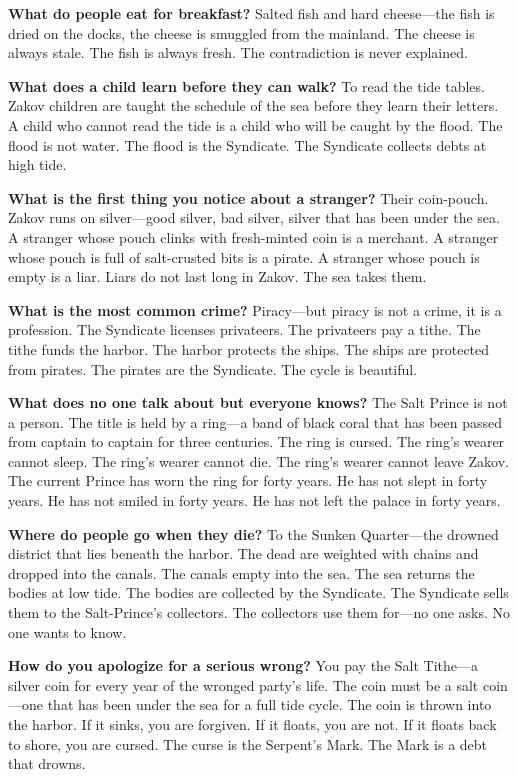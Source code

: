\vspace{1em}

\begin{almanac}
\textbf{What do people eat for breakfast?} Salted fish and hard cheese---the fish is dried on the docks, the cheese is smuggled from the mainland. The cheese is always stale. The fish is always fresh. The contradiction is never explained.

\textbf{What does a child learn before they can walk?} To read the tide tables. Zakov children are taught the schedule of the sea before they learn their letters. A child who cannot read the tide is a child who will be caught by the flood. The flood is not water. The flood is the Syndicate. The Syndicate collects debts at high tide.

\textbf{What is the first thing you notice about a stranger?} Their coin-pouch. Zakov runs on silver---good silver, bad silver, silver that has been under the sea. A stranger whose pouch clinks with fresh-minted coin is a merchant. A stranger whose pouch is full of salt-crusted bits is a pirate. A stranger whose pouch is empty is a liar. Liars do not last long in Zakov. The sea takes them.

\textbf{What is the most common crime?} Piracy---but piracy is not a crime, it is a profession. The Syndicate licenses privateers. The privateers pay a tithe. The tithe funds the harbor. The harbor protects the ships. The ships are protected from pirates. The pirates are the Syndicate. The cycle is beautiful.

\textbf{What does no one talk about but everyone knows?} The Salt Prince is not a person. The title is held by a ring---a band of black coral that has been passed from captain to captain for three centuries. The ring is cursed. The ring's wearer cannot sleep. The ring's wearer cannot die. The ring's wearer cannot leave Zakov. The current Prince has worn the ring for forty years. He has not slept in forty years. He has not smiled in forty years. He has not left the palace in forty years.

\textbf{Where do people go when they die?} To the Sunken Quarter---the drowned district that lies beneath the harbor. The dead are weighted with chains and dropped into the canals. The canals empty into the sea. The sea returns the bodies at low tide. The bodies are collected by the Syndicate. The Syndicate sells them to the Salt-Prince's collectors. The collectors use them for---no one asks. No one wants to know.

\textbf{How do you apologize for a serious wrong?} You pay the Salt Tithe---a silver coin for every year of the wronged party's life. The coin must be a salt coin---one that has been under the sea for a full tide cycle. The coin is thrown into the harbor. If it sinks, you are forgiven. If it floats, you are not. If it floats back to shore, you are cursed. The curse is the Serpent's Mark. The Mark is a debt that drowns.


\end{almanac}
